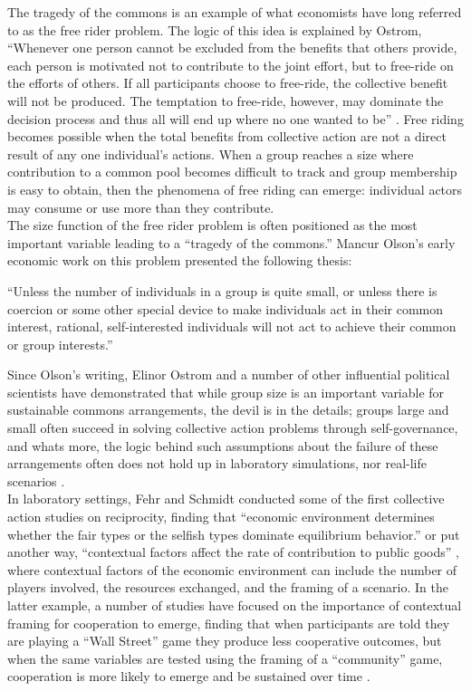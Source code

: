 \documentclass[thesis,tocnosub,noragright,centerchapter,12pt]{uiucecethesis09}
\begin{document}
The tragedy of the commons is an example of what economists have long
referred to as the free rider problem. The logic of this idea is
explained by Ostrom, ``Whenever one person cannot be excluded from the
benefits that others provide, each person is motivated not to contribute
to the joint effort, but to free-ride on the efforts of others. If all
participants choose to free-ride, the collective benefit will not be
produced. The temptation to free-ride, however, may dominate the
decision process and thus all will end up where no one wanted to be''
\citep[p. 6]{ostrom1990governing}. Free riding becomes possible when the total benefits
from collective action are not a direct result of any one individual's
actions. When a group reaches a size where contribution to a common pool
becomes difficult to track and group membership is easy to obtain, then
the phenomena of free riding can emerge: individual actors may consume
or use more than they contribute.\\

The size function of the free rider problem is often positioned as the
most important variable leading to a ``tragedy of the commons.'' Mancur
Olson's early economic work on this problem presented the following
thesis:

``Unless the number of individuals in a group is quite small, or unless
there is coercion or some other special device to make individuals act
in their common interest, rational, self-interested individuals will not
act to achieve their common or group interests.'' \citeyearpar[p. 2]{olson1965logic}

Since Olson's writing, Elinor Ostrom and a number of other influential
political scientists have demonstrated that while group size is an
important variable for sustainable commons arrangements, the devil is in
the details; groups large and small often succeed in solving
collective action problems through self-governance, and whats more, the
logic behind such assumptions about the failure of these arrangements often
does not hold up in laboratory simulations, nor real-life scenarios
\citep[for an overview of the long history of this refutation by Ostrom see(][]{aligica2009challenging}.\\

In laboratory settings, Fehr and Schmidt conducted some of the first collective action studies on reciprocity, finding that  ``economic environment determines whether the fair types or
the selfish types dominate equilibrium behavior.'' \citeyear[p. 817]{fehr1999theory} or
put another way, ``contextual factors affect the rate of contribution to
public goods'' \citep{ostrom2005}, where contextual factors of the economic
environment can include the number of players involved, the resources
exchanged, and the framing of a scenario. In the latter example, a
number of studies have focused on the importance of contextual framing
for cooperation to emerge, finding that when participants are told they
are playing a ``Wall Street'' game they produce less cooperative
outcomes, but when the same variables are tested using the framing of a
``community'' game, cooperation is more likely to emerge and be
sustained over time \citep{liberman2004name}.\\
\end{document}
